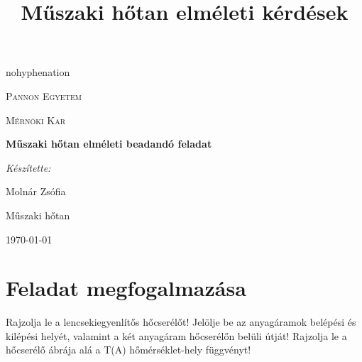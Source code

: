 \documentclass[11pt, a4paper]{report}
\author{}
\title{Műszaki hőtan elméleti kérdések}
\begin{document}
\begin{titlepage}
	\centering
	\begin{hyphenrules}{nohyphenation}
		{\scshape\LARGE Pannon Egyetem \par}
		{\scshape\LARGE Mérnöki Kar \par}
		\vfill
		\parbox{8cm}{{\centering\huge\bfseries{Műszaki hőtan elméleti beadandó feladat} \par}}
		\vfill
		{\Large\itshape Készítette:\par
			Molnár Zsófia \par}
		\vfill
		Műszaki hőtan\par
		{\large \today\par}
	\end{hyphenrules}
\end{titlepage}

\section*{Feladat megfogalmazása}
Rajzolja le a lencsekiegyenlítős hőcserélőt! Jelölje be az anyagáramok belépési és kilépési helyét, valamint a két anyagáram hőcserélőn belüli útját! Rajzolja le a hőcserélő ábrája alá a T(A) hőmérséklet-hely függvényt!
	\vspace{0.5cm}
\end{document}
